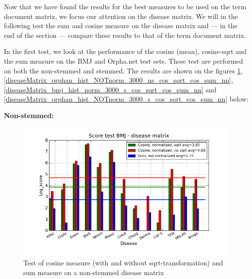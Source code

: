Now that we have found the results for the best measures to be used on
the term document matrix, we focus our attention on the disease
matrix. We will in the following test the sum and cosine measure
on the disease matrix and --- in the end of the section --- compare these
results to that of the term document matrix.

In the first test, we look at the performance of the cosine (mean),
cosine-sqrt and the sum measure on the BMJ and Orpha.net test
sets. These test are performed on both the non-stemmed and
stemmed. The results are shown on the figures
\ref{diseaseMatrix_bmj_hist_norm_3000_ns_cos_sqrt_cos_sum_nn},
\ref{diseaseMatrix_orphan_hist_NOTnorm_3000_ns_cos_sqrt_cos_sum_nn},
\ref{diseaseMatrix_bmj_hist_norm_3000_s_cos_sqrt_cos_sum_nn} and
\ref{diseaseMatrix_orphan_hist_NOTnorm_3000_s_cos_sqrt_cos_sum_nn}
below:

\textbf{Non-stemmed:}

\begin{figure}[H]
  \caption{Test of cosine measure (with and without sqrt-transformation) and sum measure on a non-stemmed disease matrix}
  \begin{center}
    \includegraphics[width=1.2\textwidth]{barcharts/diseaseMatrix_bmj_hist_norm_3000_ns_cos_sqrt_cos_sum_nn.png}
  \end{center}
  \label{diseaseMatrix_bmj_hist_norm_3000_ns_cos_sqrt_cos_sum_nn}
\end{figure}

